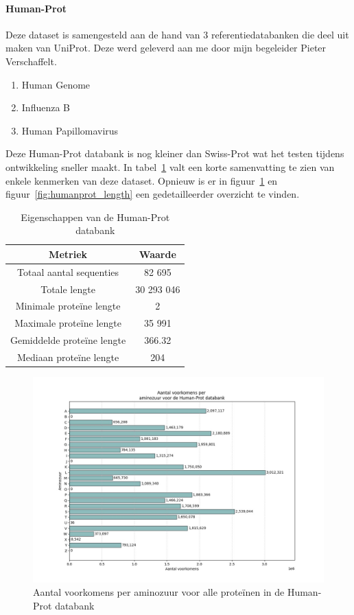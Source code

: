 \documentclass[11pt,dutch,faculty=we,layout=titlefont,underline=false,titleUppercase=true,titleUnderline=true]{ugent2016-report}
\begin{document}
    \paragraph{Human-Prot} Deze dataset is samengesteld aan de hand van 3 referentiedatabanken die deel uit maken van UniProt.
    Deze werd geleverd aan me door mijn begeleider Pieter Verschaffelt.
    \begin{enumerate}
        \item Human Genome~\cite{proteomes_homo_sapiens}
        \item Influenza B~\cite{proteomes_infuenza_b}
        \item Human Papillomavirus~\cite{proteomes_human_papillomavirus}
    \end{enumerate}

    Deze Human-Prot databank is nog kleiner dan Swiss-Prot wat het testen tijdens ontwikkeling sneller maakt.
    In tabel~\ref{tab:humanprot_eigenschappen} valt een korte samenvatting te zien van enkele kenmerken van deze dataset.
    Opnieuw is er in figuur~\ref{fig:humanprot_aminozuur} en figuur~\ref{fig:humanprot_length} een gedetailleerder overzicht te vinden.

    \begin{table}[h!]
        \centering
        \begin{tabular}{ c c }
            Metriek                    & Waarde     \\
            \hline\hline
            Totaal aantal sequenties   & 82 695     \\
            Totale lengte              & 30 293 046 \\
            Minimale proteïne lengte   & 2          \\
            Maximale proteïne lengte   & 35 991     \\
            Gemiddelde proteïne lengte & 366.32     \\
            Mediaan proteïne lengte    & 204        \\
            \hline
        \end{tabular}
        \caption{Eigenschappen van de Human-Prot databank}
        \label{tab:humanprot_eigenschappen}
    \end{table}

    \begin{figure}[H]
        \centering
        \includegraphics[width=0.7\linewidth]{humanprot_aminozuur_voorkomens}
        \caption{Aantal voorkomens per aminozuur voor alle proteïnen in de Human-Prot databank}
        \label{fig:humanprot_aminozuur}
    \end{figure}
\end{document}
